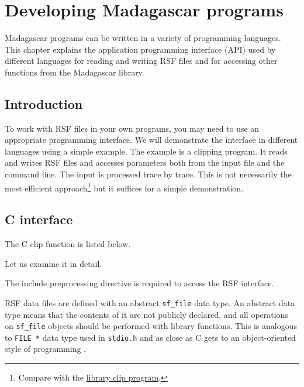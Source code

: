 \chapter{Developing Madagascar programs}


Madagascar programs can be written in a variety of programming
languages.  This chapter explains the application programming
interface (API) used by different languages for reading and writing
RSF files and for accessing other functions from the Madagascar library.


\section{Introduction}

To work with RSF files in your own programs, you may need to use an
appropriate programming interface. We will demonstrate the interface in
different languages using a simple example. The example is a clipping program.
It reads and writes RSF files and accesses parameters both from the input file
and the command line. The input is processed trace by trace. This is not
necessarily the most efficient approach\footnote{Compare with the \href{http://svn.sourceforge.net/viewcvs.cgi/rsf/trunk/filt/proc/Mclip.c?view=markup}{library clip program}.} but it suffices for a simple demonstration.

\section{C interface}

\lstset{language=c,numbers=left,numberstyle=\tiny,showstringspaces=false}
\newcommand{\rsfclip}{\RSF/api/c/test/clip.c}

The C clip function is listed below.

Let us examine it in detail. 


The include preprocessing directive is required to access the RSF interface. 


RSF data files are defined with an abstract \texttt{sf\_file} data type. An
abstract data type means that the contents of it are not publicly declared,
and all operations on \texttt{sf\_file} objects should be performed with
library functions. This is analogous to \texttt{FILE *} data type used in
\texttt{stdio.h} and as close as C gets to an object-oriented style of
programming \cite[]{cbook}.


